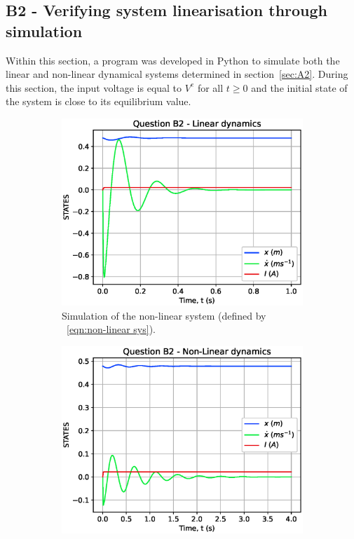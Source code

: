 \documentclass[a4paper,10pt,reqno]{amsart}
\numberwithin{equation}{section}
\begin{document}
\subsection{B2 - Verifying system linearisation through simulation}

\par Within this section, a program was developed in Python to simulate both the linear and non-linear dynamical systems determined in section~\ref{sec:A2}. During this section, the input voltage is equal to $V^e$ for all $t\geq0$ and the initial state of the system is close to its equilibrium value.

\begin{figure}[h]
\begin{subfigure}{.5\linewidth}
    \centering
    \includegraphics[width=1\linewidth]{Figures/B2_Linear.eps}
    \caption{Simulation of the non-linear system (defined by ~\ref{eqn:non-linear sys}).}
    \label{fig:B2LDiagram}
\end{subfigure}%
\begin{subfigure}{.5\linewidth}
    \centering
    \includegraphics[width=1\linewidth]{Figures/B2_NonLinear.eps}

\end{subfigure}
\end{figure}
\end{document}
